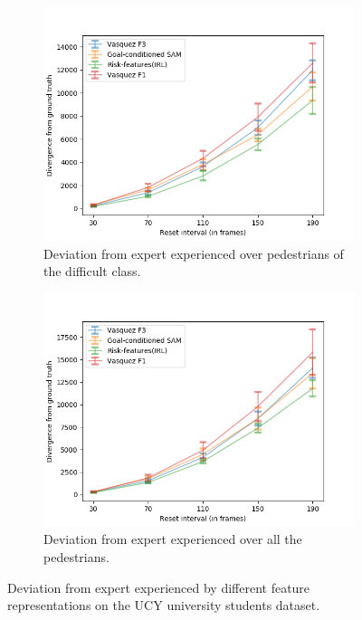 \begin{figure}[htbp]
\begin{subfigure}{0.5\textwidth}
	\end{subfigure}
	\begin{subfigure}{0.5\textwidth}
		\centering
		\includegraphics[width=\linewidth]{plots/ucy_inter_irl_new/drift_hard_ucy_inter_irl.png}
		\caption {Deviation from expert experienced over pedestrians of the difficult class.}
		\label{fig:inter_IRL-drift_analysis_hard}
	\end{subfigure}
	\begin{subfigure}{0.5\textwidth}
		\centering
		\includegraphics[width=\linewidth]{plots/ucy_inter_irl_new/drift_all_ucy_inter_irl.png}
		\caption {Deviation from expert experienced over all the pedestrians.}
		\label{fig:inter_IRL-drift_analysis_all}
	\end{subfigure}
	\caption{Deviation from expert experienced by different feature representations on the UCY university students dataset.}
\end{figure}


